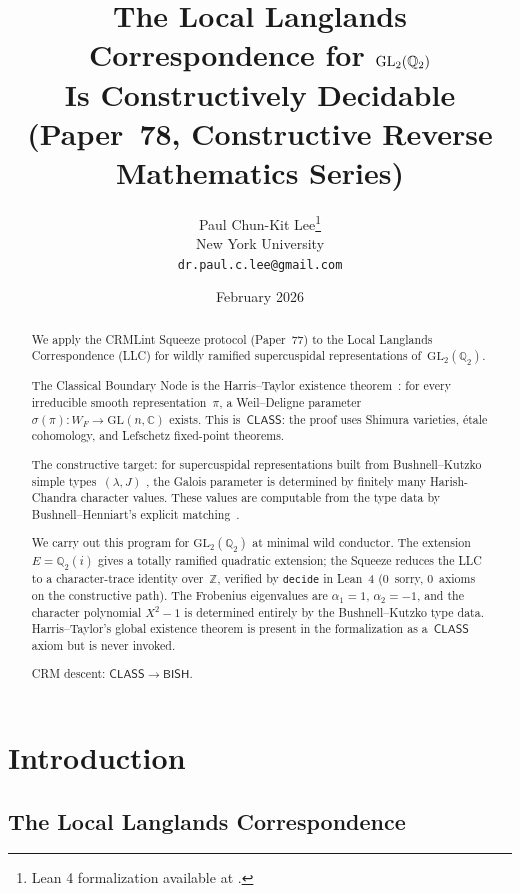 \documentclass[11pt]{article}
\title{The Local Langlands Correspondence for $\GL_2(\Q_2)$\\
  Is Constructively Decidable\\[6pt]
  {\large (Paper~78, Constructive Reverse Mathematics Series)}}
\author{Paul Chun-Kit Lee\thanks{Lean 4 formalization available at \leanRepo.} \\
New York University \\
\texttt{dr.paul.c.lee@gmail.com}}
\date{February 2026}
\theoremstyle{plain}
\theoremstyle{definition}
\theoremstyle{remark}
\newcommand{\Z}{\mathbb{Z}}
\newcommand{\Q}{\mathbb{Q}}
\newcommand{\C}{\mathbb{C}}
\newcommand{\GL}{\mathrm{GL}}
\newcommand{\BISH}{\mathsf{BISH}}
\newcommand{\CLASS}{\mathsf{CLASS}}
\begin{document}
\maketitle

\begin{abstract}
We apply the CRMLint Squeeze protocol (Paper~77) to the Local
Langlands Correspondence (LLC) for wildly ramified supercuspidal
representations of~$\GL_2(\Q_2)$.

The Classical Boundary Node is the Harris--Taylor existence
theorem~\cite{HarrisTaylor2001}: for every irreducible smooth
representation~$\pi$, a Weil--Deligne parameter
$\sigma(\pi) : W_F \to \GL(n, \C)$ exists.  This is~$\CLASS$:
the proof uses Shimura varieties, \'etale cohomology, and
Lefschetz fixed-point theorems.

The constructive target: for supercuspidal representations
built from Bushnell--Kutzko simple types~$(\lambda, J)$
\cite{BushnellKutzko1993}, the Galois parameter is determined
by finitely many Harish-Chandra character values.  These values
are computable from the type data by Bushnell--Henniart's
explicit matching~\cite{BushnellHenniart2006}.

We carry out this program for $\GL_2(\Q_2)$ at minimal wild
conductor.  The extension $E = \Q_2(i)$ gives a totally
ramified quadratic extension; the Squeeze reduces the LLC to
a character-trace identity over~$\Z$, verified by
\texttt{decide} in Lean~4 (0~sorry, 0~axioms on the
constructive path).  The Frobenius eigenvalues are
$\alpha_1 = 1$, $\alpha_2 = -1$, and the character polynomial
$X^2 - 1$ is determined entirely by the Bushnell--Kutzko type
data.  Harris--Taylor's global existence theorem is present in
the formalization as a~$\CLASS$ axiom but is never invoked.

CRM descent: $\CLASS \to \BISH$.
\end{abstract}

\tableofcontents

\section{Introduction}\label{sec:intro}

\subsection{The Local Langlands Correspondence}
\end{document}
